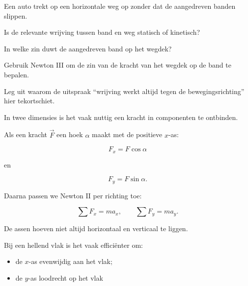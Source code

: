 \documentclass{ximera}
\begin{document}
\begin{oefening}{\oefG}

Een auto trekt op een horizontale weg op zonder dat de aangedreven
banden slippen.

\begin{question}
Is de relevante wrijving tussen band en weg statisch of kinetisch?
\end{question}

\begin{question}
In welke zin duwt de aangedreven band op het wegdek?
\end{question}

\begin{question}
Gebruik Newton III om de zin van de kracht van het wegdek op de band
te bepalen.
\end{question}

\begin{question}
Leg uit waarom de uitspraak ``wrijving werkt altijd tegen de
bewegingsrichting'' hier tekortschiet.
\end{question}

\end{oefening}




In twee dimensies is het vaak nuttig een kracht in componenten te
ontbinden.

Als een kracht $\vec F$ een hoek $\alpha$ maakt met de positieve
$x$-as:

\[
\boxed{
F_x=F\cos\alpha
}
\]

en

\[
\boxed{
F_y=F\sin\alpha.
}
\]

Daarna passen we Newton II per richting toe:

\[
\boxed{
\sum F_x=ma_x,
\qquad
\sum F_y=ma_y.
}
\]



De assen hoeven niet altijd horizontaal en verticaal te liggen.

Bij een hellend vlak is het vaak efficiënter om:

\begin{itemize}
  \item de $x$-as evenwijdig aan het vlak;
  \item de $y$-as loodrecht op het vlak
\end{itemize}
\end{document}
